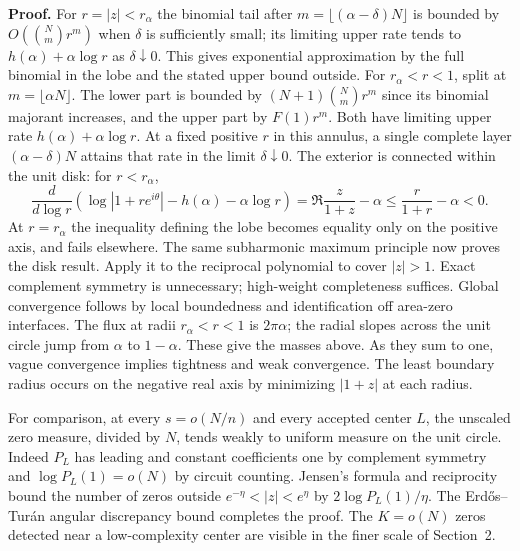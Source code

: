\documentclass[11pt]{article}
\begin{document}
\textbf{Proof.} For \(r=|z|<r_\alpha\) the binomial tail after \(m=\lfloor(\alpha-\delta)N\rfloor\) is bounded by \(O({N\choose m}r^m)\) when \(\delta\) is sufficiently small; its limiting upper rate tends to \(h(\alpha)+\alpha\log r\) as \(\delta\downarrow0\). This gives exponential approximation by the full binomial in the lobe and the stated upper bound outside. For \(r_\alpha<r<1\), split at \(m=\lfloor\alpha N\rfloor\). The lower part is bounded by \((N+1){N\choose m}r^m\) since its binomial majorant increases, and the upper part by \(F(1)r^m\). Both have limiting upper rate \(h(\alpha)+\alpha\log r\). At a fixed positive \(r\) in this annulus, a single complete layer \((\alpha-\delta)N\) attains that rate in the limit \(\delta\downarrow0\). The exterior is connected within the unit disk: for \(r<r_\alpha\),
\[
 \frac{d}{d\log r}(\log|1+re^{i\theta}|-h(\alpha)-\alpha\log r)
 =\Re\frac{z}{1+z}-\alpha\le\frac r{1+r}-\alpha<0 .
\]
At \(r=r_\alpha\) the inequality defining the lobe becomes equality only on the positive axis, and fails elsewhere. The same subharmonic maximum principle now proves the disk result. Apply it to the reciprocal polynomial to cover \(|z|>1\). Exact complement symmetry is unnecessary; high-weight completeness suffices. Global convergence follows by local boundedness and identification off area-zero interfaces. The flux at radii \(r_\alpha<r<1\) is \(2\pi\alpha\); the radial slopes across the unit circle jump from \(\alpha\) to \(1-\alpha\). These give the masses above. As they sum to one, vague convergence implies tightness and weak convergence. The least boundary radius occurs on the negative real axis by minimizing \(|1+z|\) at each radius.

For comparison, at every $s=o(N/n)$ and every accepted center $L$, the unscaled zero measure, divided by $N$, tends weakly to uniform measure on the unit circle. Indeed $P_L$ has leading and constant coefficients one by complement symmetry and $\log P_L(1)=o(N)$ by circuit counting. Jensen's formula and reciprocity bound the number of zeros outside $e^{-\eta}<|z|<e^\eta$ by $2\log P_L(1)/\eta$. The Erd\H{o}s--Tur\'an angular discrepancy bound \cite{et} completes the proof. The $K=o(N)$ zeros detected near a low-complexity center are visible in the finer scale of Section~2.








\end{document}

